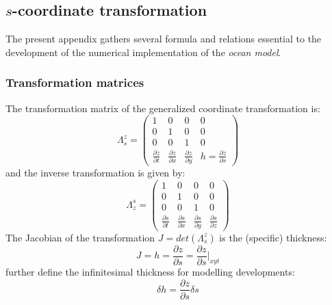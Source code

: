 \subsection{$s$-coordinate transformation}
\label{section_annexe2}
The present appendix gathers several formula and relations essential to the development of the numerical implementation of the \textit{ocean model}.
%
\subsubsection{Transformation matrices}
\label{annexe_coordS}
The transformation matrix of the generalized coordinate transformation is:
\begin{equation}
    \displaystyle
    \Lambda^z_s=
    \begin{pmatrix}
    1 & 0 & 0 & 0 \\
    0 & 1 & 0 & 0 \\
    0 & 0 & 1 & 0 \\
    \frac{\partial z}{\partial t} & \frac{\partial z}{\partial x}
    & \frac{\partial z}{\partial y} & h=\frac{\partial z}{\partial s}
    \end{pmatrix}
\end{equation}
and the inverse transformation is given by:
\begin{equation}
    \displaystyle
    \Lambda_z^s=
    \begin{pmatrix}
    1 & 0 & 0 & 0 \\
    0 & 1 & 0 & 0 \\
    0 & 0 & 1 & 0 \\
    \frac{\partial s}{\partial t} & \frac{\partial s}{\partial x}
    & \frac{\partial s}{\partial y} & \frac{\partial s}{\partial z}
    \end{pmatrix}
\end{equation}
The Jacobian of the transformation $J=det(\Lambda^z_s)$ is the (specific) thickness:
\begin{equation}
 \displaystyle
 J=h=\frac{\partial z}{\partial s}=\frac{\partial z}{\partial s}\bigg\vert_{xyt}
\end{equation}
\cite{griffies_fundamentals_2004} further define the infinitesimal  thickness for modelling developments:
\begin{equation}
 \displaystyle
 \delta h=\frac{\partial z}{\partial s} \delta s
\end{equation}

